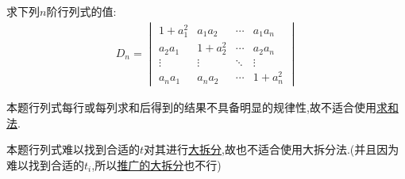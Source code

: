 \documentclass[../../main.tex]{subfiles}%
\begin{document}
\begin{example}
求下列$n$阶行列式的值:
\begin{align*}
D_n = 
\begin{vmatrix}
1 + a_1^2 & a_1 a_2 & \cdots & a_1 a_n \\
a_2 a_1 & 1 + a_2^2 & \cdots & a_2 a_n \\
\vdots & \vdots & \ddots & \vdots \\
a_n a_1 & a_n a_2 & \cdots & 1 + a_n^2
\end{vmatrix}
\end{align*}
\end{example}
\begin{note}
本题行列式每行或每列求和后得到的结果不具备明显的规律性,故不适合使用\hyperref[行列式计算:求和法]{求和法}.

本题行列式难以找到合适的$t$对其进行\hyperref[大拆分法]{大拆分},故也不适合使用大拆分法.(并且因为难以找到合适的$t_i$,所以\hyperref[大拆分法的推广]{推广的大拆分}也不行)
\end{note}
\end{document}
